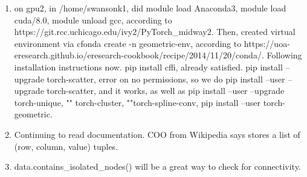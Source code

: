 \documentclass[12pt,reqno]{amsart}
\numberwithin{equation}{section}
\begin{document}
\begin{enumerate}
\item on gpu2, in /home/swansonk1, did module load Anaconda3, module load cuda/8.0, module unload gcc, according to https://git.rcc.uchicago.edu/ivy2/PyTorch\_midway2.  Then, created virtual environment via cfonda create -n geometric-env, according to https://uoa-eresearch.github.io/eresearch-cookbook/recipe/2014/11/20/conda/.  Following installation instructions now.  pip install cffi, already satisfied.  pip install --upgrade torch-scatter, error on no permissions, so we do pip install --user --upgrade torch-scatter, and it works, as well as pip install --user --upgrade torch-unique, "" torch-cluster, ""torch-spline-conv, pip install --user torch-geometric.  
\item Continuing to read documentation.  COO from Wikipedia says stores a list of (row, column, value) tuples.  
\item data.contains\_isolated\_nodes() will be a great way to check for connectivity.    
\end{enumerate}
\end{document}

